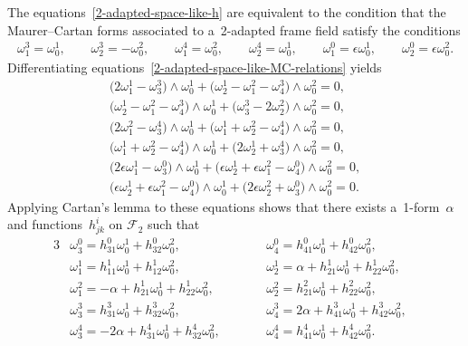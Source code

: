 \documentclass[10pt,a4paper]{amsart}
\numberwithin{equation}{section}
\theoremstyle{definition}
\begin{document}
The equations~\eqref{2-adapted-space-like-h} are equivalent to the condition that the Maurer--Cartan forms associated to
a~2-adapted frame f\/ield satisfy the conditions
\begin{gather}
\omega^3_1= \omega^1_0,
\qquad
\omega^3_2=-\omega^2_0,
\qquad
\omega^4_1=\omega^2_0,
\qquad
\omega^4_2=\omega^1_0,
\qquad
\omega^0_1=\epsilon  \omega^1_0,
\qquad
\omega^0_2=\epsilon  \omega^2_0.
\label{2-adapted-space-like-MC-relations}
\end{gather}
Dif\/ferentiating equations~\eqref{2-adapted-space-like-MC-relations} yields
\begin{gather*}
\big(2\omega^1_1 - \omega^3_3\big) \wedge \omega^1_0 + \big(\omega^1_2 - \omega^2_1 - \omega^3_4\big) \wedge \omega^2_0 = 0,
\\
\big(\omega^1_2 - \omega^2_1 - \omega^3_4\big) \wedge \omega^1_0 + \big(\omega^3_3 - 2\omega^2_2\big) \wedge \omega^2_0 = 0,
\\
\big(2\omega^2_1 - \omega^4_3\big) \wedge \omega^1_0 + \big(\omega^1_1 + \omega^2_2 - \omega^4_4\big) \wedge \omega^2_0 = 0,
\\
\big(\omega^1_1 + \omega^2_2 - \omega^4_4\big) \wedge \omega^1_0 + \big(2\omega^1_2 + \omega^4_3\big) \wedge \omega^2_0 = 0,
\\
\big(2\epsilon\omega^1_1 - \omega^0_3\big) \wedge \omega^1_0 + \big(\epsilon\omega^1_2 + \epsilon\omega^2_1 - \omega^0_4\big)
\wedge \omega^2_0 = 0,
\\
\big(\epsilon\omega^1_2 + \epsilon\omega^2_1 - \omega^0_4\big) \wedge \omega^1_0 + \big(2\epsilon\omega^2_2 + \omega^0_3\big)
\wedge \omega^2_0 = 0.
\end{gather*}
Applying Cartan's lemma to these equations shows that there exists a~1-form~$\alpha$ and func\-tions~$h^i_{jk}$ on
$\mathcal{F}_2$ such that
\begin{alignat}{3}
& \omega^0_3=h^0_{31}\omega^1_0 + h^0_{32}\omega^2_0,
\qquad&&
\omega^0_4=h^0_{41}\omega^1_0 + h^0_{42}\omega^2_0,&
\nonumber
\\
&\omega^1_1=h^1_{11}\omega^1_0 + h^1_{12}\omega^2_0,
\qquad&&
\omega^1_2=\alpha + h^1_{21}\omega^1_0 + h^1_{22}\omega^2_0,&
\nonumber
\\
&\omega^2_1=-\alpha + h^1_{21}\omega^1_0 + h^1_{22}\omega^2_0,
\qquad&&
\omega^2_2=h^2_{21}\omega^1_0 + h^2_{22}\omega^2_0,&
\nonumber
\\
&\omega^3_3=h^3_{31}\omega^1_0 + h^3_{32}\omega^2_0,
\qquad&&
\omega^3_4=2\alpha + h^3_{41}\omega^1_0 + h^3_{42}\omega^2_0,&
\nonumber
\\
&\omega^4_3=-2\alpha + h^4_{31}\omega^1_0 + h^4_{32}\omega^2_0,
\qquad&&
\omega^4_4=h^4_{41}\omega^1_0 + h^4_{42}\omega^2_0.&
\label{2-adapted-space-like-MC-semi-basic-forms}
\end{alignat}
\end{document}
